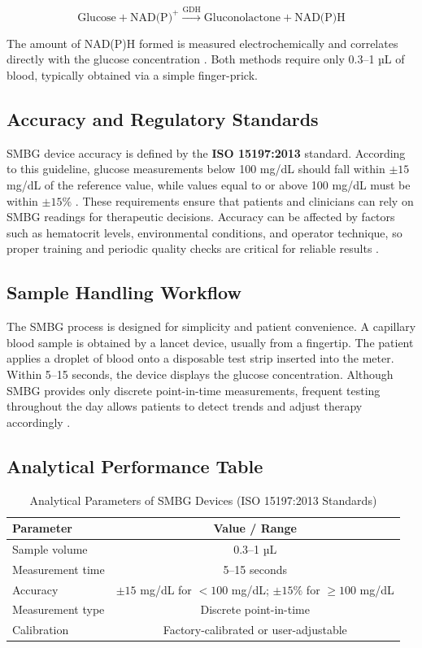 \documentclass[12pt,a4paper]{article}  %
\begin{document}
\[
\text{Glucose} + \text{NAD(P)}^+ \xrightarrow{\text{GDH}} \text{Gluconolactone} + \text{NAD(P)H}
\]

The amount of NAD(P)H formed is measured electrochemically and correlates directly with the glucose concentration \cite{Heinemann2018}. Both methods require only 0.3--1 µL of blood, typically obtained via a simple finger-prick.

\subsection{Accuracy and Regulatory Standards}
SMBG device accuracy is defined by the \textbf{ISO 15197:2013} standard. According to this guideline, glucose measurements below 100 mg/dL should fall within \(\pm 15\) mg/dL of the reference value, while values equal to or above 100 mg/dL must be within \(\pm 15\%\) \cite{ISO15197}. These requirements ensure that patients and clinicians can rely on SMBG readings for therapeutic decisions. Accuracy can be affected by factors such as hematocrit levels, environmental conditions, and operator technique, so proper training and periodic quality checks are critical for reliable results \cite{Heinemann2018}.

\subsection{Sample Handling Workflow}
The SMBG process is designed for simplicity and patient convenience. A capillary blood sample is obtained by a lancet device, usually from a fingertip. The patient applies a droplet of blood onto a disposable test strip inserted into the meter. Within 5--15 seconds, the device displays the glucose concentration. Although SMBG provides only discrete point-in-time measurements, frequent testing throughout the day allows patients to detect trends and adjust therapy accordingly \cite{Bergenstal2017}. 

\subsection{Analytical Performance Table}
\FloatBarrier
\begin{table}[h!]
\centering
\caption{Analytical Parameters of SMBG Devices (ISO 15197:2013 Standards)}
\begin{tabular}{l c}
\hline
\textbf{Parameter} & \textbf{Value / Range} \\
\hline
Sample volume & 0.3--1 µL \\
Measurement time & 5--15 seconds \\
Accuracy & $\pm 15$ mg/dL for $<100$ mg/dL; $\pm 15\%$ for $\geq 100$ mg/dL \\
Measurement type & Discrete point-in-time \\
Calibration & Factory-calibrated or user-adjustable \\
\hline
\end{tabular}
\label{tab:smbg_performance}
\end{table}
\FloatBarrier
\end{document}
